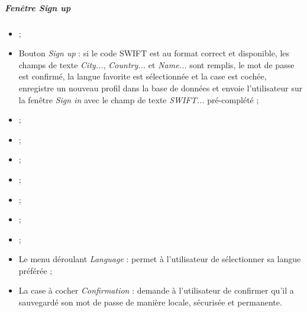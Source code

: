 \subparagraph{Fenêtre \emph{Sign up}}
\begin{itemize}
\item {} ;
\item Bouton \emph{Sign up} : si le code SWIFT est au format correct et disponible, les champs de texte \emph{City...}, \emph{Country...} et \emph{Name...} sont remplis, le mot de passe est confirmé, la langue favorite est sélectionnée et la case est cochée, enregistre un nouveau profil dans la base de données et envoie l'utilisateur sur la fenêtre \emph{Sign in} avec le champ de texte \emph{SWIFT...} pré-complété ;
\item {} ;
\item {} ;
\item {} ;
\item {} ;
\item {} ;
\item {} ;
\item {} ;
\item Le menu déroulant \emph{Language} : permet à l'utilisateur de sélectionner sa langue préférée ;
\item La case à cocher \emph{Confirmation} : demande à l'utilisateur de confirmer qu'il a sauvegardé son mot de passe de manière locale, sécurisée et permanente.
\end{itemize}


